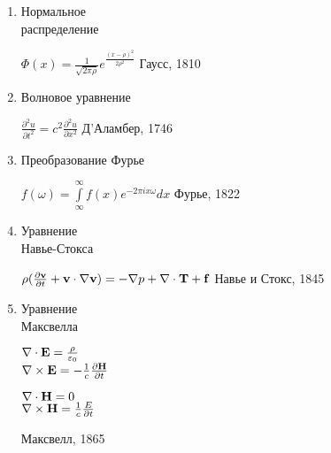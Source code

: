 \documentclass[a4paper, 12pt]{article}
\begin{document}
\begin{enumerate}
 \item \begin{minipage}[t]{45mm} Нормальное \\распределение\\ \end{minipage} \hfill \begin{minipage}[t]{100mm} $\Phi(x) = \frac{1}{\sqrt{2\pi\rho}}e^\frac{(x-\rho)^2}{2\rho^2}$ \hfill Гаусс, 1810 \end{minipage}
 
 \item Волновое уравнение \hfill \begin{minipage}[t]{80mm} $\frac{\partial^2 u}{\partial t^2} = c^2 \frac{\partial^2 u}{\partial x^2}$ \hfill Д'Аламбер, 1746 \end{minipage}
 
 \item Преобразование Фурье \hfill \begin{minipage}[t]{80mm} $f(\omega) = \int\limits_\infty ^\infty f(x)e^{-2\pi ix \omega}dx$  \hfill Фурье, 1822 \end{minipage}
 \item
  
  \begin{minipage}[t]{45mm} Уравнение \\Навье-Стокса\\
  \end{minipage}
  \hfill
  \begin{minipage}[t]{110mm}$\rho(\frac{\partial {\bf v}}{\partial t}+{\bf v}\cdot\nabla{\bf v} ) = -\nabla p+\nabla\cdot{\bf T}+{\bf f}$ \hfill Навье и Стокс, 1845
  \end{minipage}

   \item \begin{minipage}[t]{45mm} Уравнение \\Максвелла\\ \end{minipage} \hfill \begin{minipage}[t]{80mm}  \begin{minipage}[t]{35mm}  $\nabla\cdot{\bf E} =   \frac{\rho}{\varepsilon_0}$ \\ $\nabla\times{\bf E} = -\frac{1}{c} \frac{\partial{\bf H}}{\partial t}$ \\ \end{minipage}
  \begin{minipage}[t]{25mm} $\nabla\cdot{\bf H} = 0$ \\$\nabla\times{\bf H} = \frac{1}{c} \frac {E}{\partial t}$ \\
   \end{minipage}  \hfill Максвелл, 1865\end{minipage}


\end{enumerate}
\end{document}
